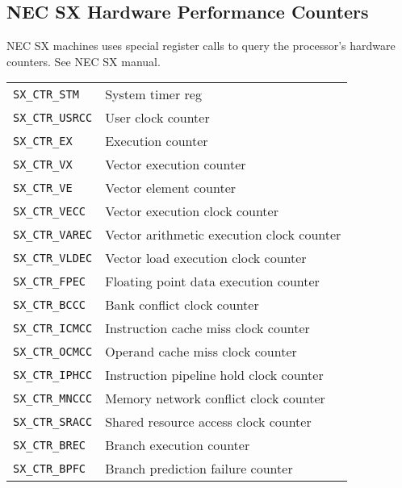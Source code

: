 \begin{multicols}{3}
\subsection*{NEC SX Hardware Performance Counters}
NEC SX machines uses special register calls to query the processor's  hardware counters. See NEC SX manual.
\begin{tabular}{@{}ll@{}}
\texttt{SX\_CTR\_STM}   & System timer reg\\
\texttt{SX\_CTR\_USRCC} & User clock counter\\
\texttt{SX\_CTR\_EX}    & Execution counter\\
\texttt{SX\_CTR\_VX }   & Vector execution counter\\
\texttt{SX\_CTR\_VE}    & Vector element counter\\
\texttt{SX\_CTR\_VECC}  & Vector execution clock counter\\
\texttt{SX\_CTR\_VAREC} & Vector arithmetic execution clock counter\\
\texttt{SX\_CTR\_VLDEC} & Vector load execution clock counter\\
\texttt{SX\_CTR\_FPEC}  & Floating point data execution counter\\
\texttt{SX\_CTR\_BCCC}  & Bank conflict clock counter\\
\texttt{SX\_CTR\_ICMCC} & Instruction cache miss clock counter\\
\texttt{SX\_CTR\_OCMCC} & Operand cache miss clock counter\\
\texttt{SX\_CTR\_IPHCC} & Instruction pipeline hold clock counter\\
\texttt{SX\_CTR\_MNCCC} & Memory network conflict clock counter\\
\texttt{SX\_CTR\_SRACC} & Shared resource access clock counter\\
\texttt{SX\_CTR\_BREC}  & Branch execution counter\\
\texttt{SX\_CTR\_BPFC}  & Branch prediction failure counter
\end{tabular}


\end{multicols}
